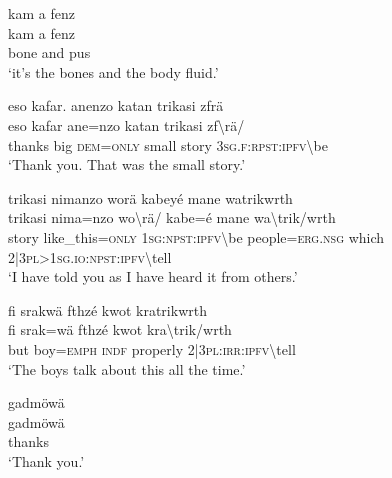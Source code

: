 \ea\label{ex:a4397}
kam a fenz\\
\gll kam	a	fenz\\
     bone	and	pus\\
\glt `it's the bones and the body fluid.'
\z

\ea\label{ex:a4398}
eso kafar. anenzo katan trikasi zfrä\\
\gll eso	kafar	ane=nzo	katan	trikasi	zf{\textbackslash}rä/\\
     thanks	big	\textsc{dem}=\textsc{only}	small	story	3\textsc{sg}.\textsc{f}:\textsc{rpst}:\textsc{ipfv}{\textbackslash}be\\
\glt `Thank you. That was the small story.'
\z

\ea\label{ex:a4399}
trikasi nimanzo worä kabeyé mane watrikwrth\\
\gll trikasi	nima=nzo	wo{\textbackslash}rä/	kabe=é	mane	wa{\textbackslash}trik/wrth\\
     story	like\_this=\textsc{only}	1\textsc{sg}:\textsc{npst}:\textsc{ipfv}{\textbackslash}be	people=\textsc{erg}.\textsc{nsg}	which	2|3\textsc{pl}>1\textsc{sg}.\textsc{io}:\textsc{npst}:\textsc{ipfv}{\textbackslash}tell\\
\glt `I have told you as I have heard it from others.'
\z

\ea\label{ex:a4400}
fi srakwä fthzé kwot kratrikwrth\\
\gll fi	srak=wä	fthzé	kwot	kra{\textbackslash}trik/wrth\\
     but	boy=\textsc{emph}	\textsc{indf}	properly	2|3\textsc{pl}:\textsc{irr}:\textsc{ipfv}{\textbackslash}tell\\
\glt `The boys talk about this all the time.'
\z

\ea\label{ex:a4401}
gadmöwä\\
\gll gadmöwä\\
     thanks\\
\glt `Thank you.'
\z